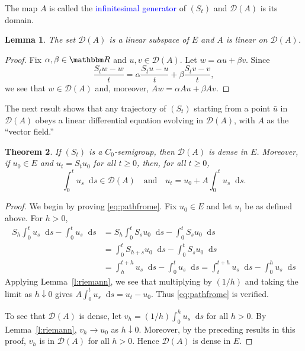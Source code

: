 \documentclass[12pt, reqno]{amsart}
\renewcommand{\geq}{\geqslant}
\newcommand{\1}{\mathbbm 1}
\newcommand*\diff{\mathop{}\!\mathrm{d}}
\newcommand{\dD}{\mathcal D}
\newcommand{\RR}{\mathbbm R}
\theoremstyle{plain}
\newtheorem{theorem}{Theorem}[section]
\newtheorem{lemma}[theorem]{Lemma}
\theoremstyle{definition}
\newcommand{\navy}[1]{\textcolor{blue}{#1}}
\begin{document}
The map $A$ is called the \navy{infinitesimal generator} of $(S_t)$ and $\dD(A)$
is its domain.  

\begin{lemma}\label{l:dals}
    The set $\dD(A)$ is a linear subspace of $E$ and $A$ is linear on $\dD(A)$.
\end{lemma}

\begin{proof}
    Fix $\alpha, \beta \in \RR$ and $u,v \in \dD(A)$.  Let $w = \alpha u + \beta v$.
    Since
    \begin{equation*}
        \frac{S_t w - w}{t} 
        = \alpha \frac{S_t  u - u}{t} + \beta \frac{S_t  v - v}{t},
    \end{equation*}
    we see that $w \in \dD(A)$ and, moreover, $Aw = \alpha Au + \beta Av$.
\end{proof}

The next result shows that any trajectory of $(S_t)$ starting from a point $\bar
u$ in $\dD(A)$ obeys a linear differential equation evolving in $\dD(A)$, with $A$
as the ``vector field.''


\begin{theorem}\label{t:diffpath}
    If $(S_t)$ is a $C_0$-semigroup, then $\dD(A)$ is dense in $E$.  Moreover,
    if $u_0 \in E$ and $u_t = S_t u_0$ for all $t \geq 0$, then, for all $t \geq
    0$,
    \begin{equation}\label{eq:pathfrome}
        \int_0^t u_s \diff s \in \dD(A) \quad \text{and} \quad
        u_t = u_0 + A \int_0^t u_s \diff s.
    \end{equation}
\end{theorem}


\begin{proof}
    We begin by proving \eqref{eq:pathfrome}. Fix $u_0 \in E$ and let $u_t$ be
    as defined above.  For $h > 0$,
    \begin{align*}
            S_h \int_0^t u_s \diff s - \int_0^t u_s \diff s
        & = 
            S_h \int_0^t S_s u_0 \diff s - \int_0^t S_s u_0 \diff s
        \\
        & = 
            \int_0^t S_{h + s} u_0 \diff s - \int_0^t S_s u_0 \diff s
        \\
        & = 
            \int_h^{t+h} u_s \diff s - \int_0^t u_s \diff s
        = 
            \int_t^{t+h} u_s \diff s - \int_0^h u_s \diff s
    \end{align*}
    Applying Lemma~\ref{l:riemann}, we see that multiplying by $(1/h)$ and taking the limit as $h
    \downarrow 0$ gives $A \int_0^t u_s \diff s = u_t - u_0$. Thus
    \eqref{eq:pathfrome} is verified.

    To see that $\dD(A)$ is dense, let $v_h = (1/h) \int_0^h u_s \diff s$ for
    all $h > 0$. By Lemma~\ref{l:riemann},  $v_h \to u_0$ as $h \downarrow 0$.
    Moreover, by the preceding results in this proof, $v_h$ is in $\dD(A)$ for
    all $h > 0$.   Hence $\dD(A)$ is dense in $E$.
\end{proof}
\end{document}
